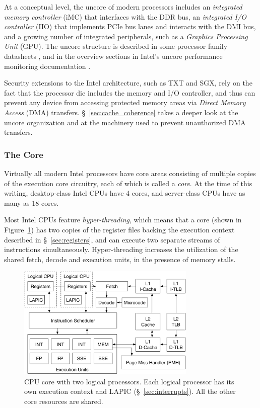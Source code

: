 
At a conceptual level, the uncore of modern processors includes an
\textit{integrated memory controller} (iMC) that interfaces with the DDR bus,
an \textit{integrated I/O controller} (IIO) that implements PCIe bus lanes and
interacts with the DMI bus, and a growing number of integrated peripherals,
such as a \textit{Graphics Processing Unit} (GPU). The uncore structure is
described in some processor family datasheets \cite{intel2014datasheet,
intel2010datasheet}, and in the overview sections in Intel's uncore performance
monitoring documentation \cite{intel2014uncore, intel2012uncore,
intel2010uncore}.

Security extensions to the Intel architecture, such as TXT and SGX, rely on the
fact that the processor die includes the memory and I/O controller, and thus
can prevent any device from accessing protected memory areas via
\textit{Direct Memory Access} (DMA) transfers. \S~\ref{sec:cache_coherence}
takes a deeper look at the uncore organization and at the machinery used to
prevent unauthorized DMA transfers.


\subsubsection{The Core}
\label{sec:cpu_core}

Virtually all modern Intel processors have core areas consisting of multiple
copies of the execution core circuitry, each of which is called a
\textit{core}.  At the time of this writing, desktop-class Intel CPUs have 4
cores, and server-class CPUs have as many as 18 cores.

Most Intel CPUs feature \textit{hyper-threading}, which means that a core
(shown in Figure~\ref{fig:cpu_core}) has two copies of the register files
backing the execution context described in \S~\ref{sec:registers}, and can
execute two separate streams of instructions simultaneously. Hyper-threading
increases the utilization of the shared fetch, decode and execution units, in
the presence of memory stalls.

\begin{figure}[hbt]
  \centering
  \includegraphics[width=85mm]{figures/cpu_core.pdf}
  \caption{
    CPU core with two logical processors. Each logical processor has its own
    execution context and LAPIC (\S~\ref{sec:interrupts}). All the other core
    resources are shared.
  }
  \label{fig:cpu_core}
\end{figure}

